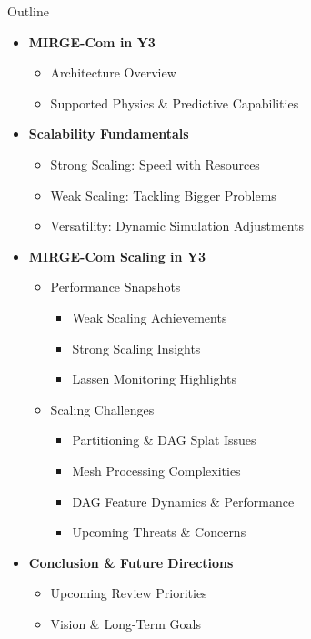 \begin{frame}{Outline}
\begin{itemize}
    \item \textbf{MIRGE-Com in Y3}
    \begin{itemize}
        \item Architecture Overview
        \item Supported Physics \& Predictive Capabilities
    \end{itemize}
    
    \item \textbf{Scalability Fundamentals}
    \begin{itemize}
        \item Strong Scaling: Speed with Resources
        \item Weak Scaling: Tackling Bigger Problems
        \item Versatility: Dynamic Simulation Adjustments
    \end{itemize}
    
    \item \textbf{MIRGE-Com Scaling in Y3}
    \begin{itemize}
        \item Performance Snapshots
        \begin{itemize}
            \item Weak Scaling Achievements
            \item Strong Scaling Insights
            \item Lassen Monitoring Highlights
        \end{itemize}
        \item Scaling Challenges
        \begin{itemize}
            \item Partitioning \& DAG Splat Issues
            \item Mesh Processing Complexities
            \item DAG Feature Dynamics \& Performance
            \item Upcoming Threats \& Concerns
        \end{itemize}
    \end{itemize}
    
    \item \textbf{Conclusion \& Future Directions}
    \begin{itemize}
        \item Upcoming Review Priorities
        \item Vision \& Long-Term Goals
    \end{itemize}
\end{itemize}
\end{frame}

